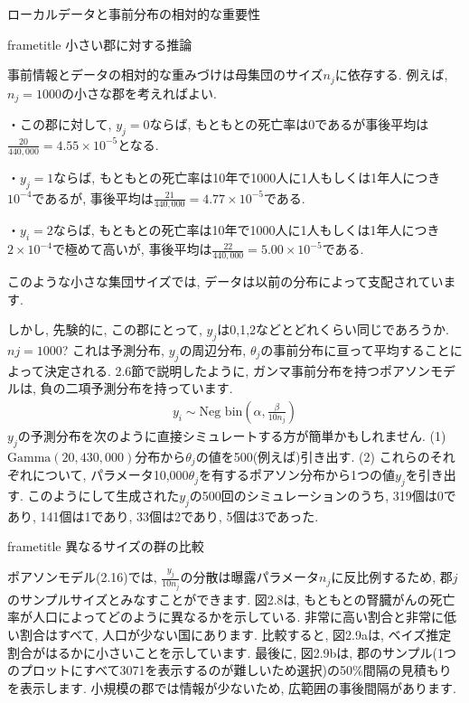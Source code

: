 \documentclass[10pt,dvipdfmx,a4]{beamer}
\newcommand{\eqn}[1]{\begin{align*}#1\end{align*}}
\newcommand{\dbox}[1]{\begin{beamercolorbox}[wd=122mm, sep=0pt, shadow=false, rounded=false]{frametitle} { #1}\end{beamercolorbox}}
\begin{document}

\begin{frame}{ローカルデータと事前分布の相対的な重要性}
\dbox{小さい郡に対する推論}
事前情報とデータの相対的な重みづけは母集団のサイズ$n_j$に依存する.
例えば, $n_j=1000$の小さな郡を考えればよい.

・この郡に対して, $y_j=0$ならば, もともとの死亡率は0であるが事後平均は$\tfrac{20}{440,000}=4.55\times 10^{-5}$となる.

・$y_j=1$ならば, もともとの死亡率は10年で1000人に1人もしくは1年人につき$10^{-4}$であるが, 事後平均は$\tfrac{21}{440,000}=4.77\times 10^{-5}$である.

・$y_i=2$ならば, もともとの死亡率は10年で1000人に1人もしくは1年人につき$2\times10^{-4}$で極めて高いが, 事後平均は$\tfrac{22}{440,000}=5.00\times 10^{-5}$である.

このような小さな集団サイズでは, データは以前の分布によって支配されています.
\end{frame}


\begin{frame}
しかし, 先験的に, この郡にとって, $y_j$は0,1,2などとどれくらい同じであろうか. $nj=1000$?
これは予測分布, $y_j$の周辺分布, $\theta_j$の事前分布に亘って平均することによって決定される.
2.6節で説明したように, ガンマ事前分布を持つポアソンモデルは, 負の二項予測分布を持っています.
\eqn{y_i\sim\text{Neg bin}\left(\alpha,\frac{\beta}{10n_j}\right)}
$y_j$の予測分布を次のように直接シミュレートする方が簡単かもしれません.
(1) $\text{Gamma}(20,430,000)$分布から$\theta_j$の値を500(例えば)引き出す.
(2) これらのそれぞれについて, パラメータ10,000$\theta_j$を有するポアソン分布から1つの値$y_j$を引き出す.
このようにして生成された$y_j$の500回のシミュレーションのうち, 319個は0であり, 141個は1であり, 33個は2であり, 5個は3であった.
\end{frame}


\begin{frame}
\dbox{異なるサイズの群の比較}
ポアソンモデル(2.16)では, $\frac{y_j}{10n_j}$の分散は曝露パラメータ$n_j$に反比例するため, 郡$j$のサンプルサイズとみなすことができます.
図2.8は, もともとの腎臓がんの死亡率が人口によってどのように異なるかを示している.
非常に高い割合と非常に低い割合はすべて, 人口が少ない国にあります.
比較すると, 図2.9aは, ベイズ推定割合がはるかに小さいことを示しています.
最後に, 図2.9bは, 郡のサンプル(1つのプロットにすべて3071を表示するのが難しいため選択)の50\%間隔の見積もりを表示します.
小規模の郡では情報が少ないため, 広範囲の事後間隔があります.
\end{frame}
\end{document}

